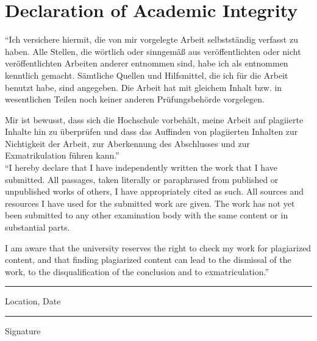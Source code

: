 \documentclass[a4paper]{book}
\begin{document}

\clearpage
\section*{Declaration of Academic Integrity}

``Ich versichere hiermit, die von mir vorgelegte Arbeit selbstst\"{a}ndig verfasst zu haben. Alle Stellen, die w\"{o}rtlich oder sinngem\"{a}\ss{} aus ver\"{o}ffentlichten oder nicht ver\"{o}ffentlichten Arbeiten anderer entnommen sind, habe ich als entnommen kenntlich gemacht. S\"{a}mtliche Quellen und Hilfsmittel, die ich f\"{u}r die Arbeit benutzt habe, sind angegeben. Die Arbeit hat mit gleichem Inhalt bzw. in wesentlichen Teilen noch keiner anderen Pr\"{u}fungsbeh\"{o}rde vorgelegen.

Mir ist bewusst, dass sich die Hochschule vorbeh\"{a}lt, meine Arbeit auf plagiierte Inhalte hin zu \"{u}berpr\"{u}fen und dass das Auffinden von plagiierten Inhalten zur Nichtigkeit der Arbeit, zur Aberkennung des Abschlusses und zur Exmatrikulation f\"{u}hren kann.''\\

\noindent ``I hereby declare that I have independently written the work that I have submitted. All passages, taken literally or paraphrased from published or unpublished works of others, I have appropriately cited as such. All sources and resources I have used for the submitted work are given. The work has not yet been submitted to any other examination body with the same content or in substantial parts.

I am aware that the university reserves the right to check my work for plagiarized content, and that finding plagiarized content can lead to the dismissal of the work, to the disqualification of the conclusion and to exmatriculation.''

\vspace{2cm}

\begin{minipage}[t]{7cm}
\rule{5cm}{0.1mm}
\flushleft
Location, Date
\end{minipage}
\null\hfill
\begin{minipage}[t]{7cm}
\rule{7cm}{0.1mm}
\flushleft
Signature
\end{minipage}

\end{document}
